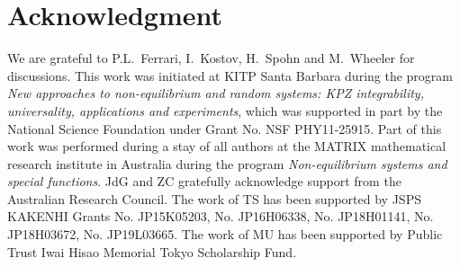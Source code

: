 \documentclass[cmp]{svjour}
\numberwithin{theorem}{section}
\numberwithin{equation}{section}
\begin{document}
\appendix



\section*{Acknowledgment}
We are grateful to P.L.~Ferrari, I.~Kostov, H.~Spohn and M.~Wheeler for discussions. This work was initiated at KITP Santa Barbara during the program \textit{New approaches to non-equilibrium and random systems: KPZ integrability, universality, applications and experiments}, which was supported in part by the National Science Foundation under Grant No. NSF PHY11-25915. Part of this work was performed during a stay of all authors at the MATRIX mathematical research institute in Australia during the program \textit{Non-equilibrium systems and special functions}. JdG and ZC gratefully acknowledge support from the Australian Research Council. The work of TS has been supported by JSPS KAKENHI Grants No. JP15K05203, No. JP16H06338, No. JP18H01141, No. JP18H03672, No. JP19L03665. 
The work of MU has been supported by Public Trust Iwai Hisao Memorial Tokyo Scholarship Fund.

\appendix
\end{document}

